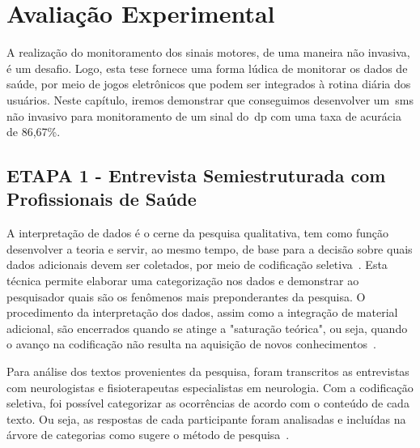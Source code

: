 \chapter{Avalia\c{c}\~{a}o Experimental} \label{chap:avaliacao}
A realização do monitoramento dos sinais motores, de uma maneira não invasiva, é um desafio. Logo, esta tese fornece uma forma lúdica de monitorar os dados de saúde, por meio de jogos eletrônicos que podem ser integrados à rotina diária dos usuários. Neste capítulo, iremos demonstrar que conseguimos desenvolver um~\ac{sms} não invasivo para monitoramento de um sinal do~\ac{dp} com uma taxa de acurácia de 86,67\%.






\section{ETAPA 1 - Entrevista Semiestruturada com Profissionais de Saúde}\label{sec:entrevista_semi_estruturada}



A interpretação de dados é o cerne da pesquisa qualitativa, tem como função desenvolver a teoria e servir, ao mesmo tempo, de base para a decisão sobre quais dados adicionais devem ser coletados, por meio de codificação seletiva~\cite{FLI04}. Esta técnica permite elaborar uma categorização nos dados e demonstrar ao pesquisador quais são os fenômenos mais preponderantes da pesquisa. O procedimento da interpretação dos dados, assim como a integração de material adicional, são encerrados quando se atinge a "saturação teórica", ou seja, quando o avanço na codificação não resulta na aquisição de novos conhecimentos~\cite{FLI04}.

Para análise dos textos provenientes da pesquisa, foram transcritos as entrevistas com neurologistas e fisioterapeutas especialistas em neurologia. Com  a codificação seletiva, foi possível categorizar as ocorrências de acordo com o conteúdo de cada texto. Ou seja, as respostas de cada participante foram analisadas e incluídas na árvore de categorias como sugere o método de pesquisa~\cite{FLI04}. 

